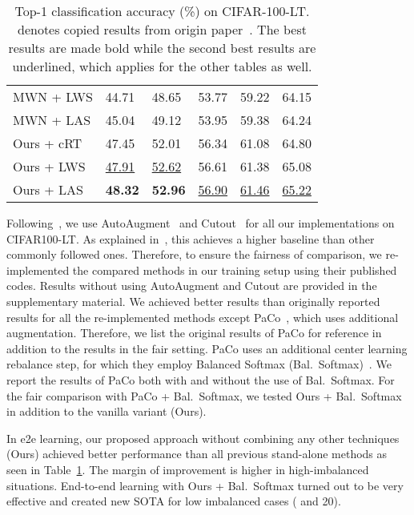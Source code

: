 \documentclass[10pt,twocolumn,letterpaper]{article}
\begin{document}
\begin{table}[t]
\begin{center}
{{\begin{tabular}{llllll}
     MWN + LWS &44.71& 48.65 & 53.77&59.22 & 64.15 \\
     MWN + LAS & 45.04& 49.12 &53.95 &59.38 & 64.24\\
Ours + cRT & 47.45 & 52.01 & 56.34 & 61.08& 64.80\\ 
     Ours + LWS & \underline{47.91} & \underline{52.62} & 56.61 & 61.38 & 65.08\\ 
     Ours + LAS & \textbf{48.32} &\textbf{52.96} & \underline{56.90} & \underline{61.46} & \underline{65.22}\\
\bottomrule
\end{tabular}
}}
\end{center}
\caption{Top-1 classification accuracy (\%) on CIFAR-100-LT. 
 denotes copied results from origin paper~\cite{PaCo,dro-lt}. The best results are made bold while the second best results are underlined, which applies for the other tables as well.}
  \label{tab:CIFAR-LT results}
\end{table}
Following~\cite{PaCo,eqlloss}, we use AutoAugment~\cite{AutoAugment} and Cutout~\cite{Cutout} for all our implementations on CIFAR100-LT. As explained in~\cite{eqlloss}, this achieves a higher baseline than other commonly followed ones. Therefore, to ensure the fairness of comparison, we re-implemented the compared methods in our training setup using their published codes. 
Results without using AutoAugment and Cutout are provided in the supplementary material.
We achieved better results than originally reported results for all the re-implemented methods except PaCo~\cite{PaCo}, which uses additional augmentation. 
Therefore, we list the original results of PaCo for reference in addition to the results in the fair setting.
PaCo uses an additional center learning rebalance step, for which they employ Balanced Softmax (Bal.~Softmax)~\cite{BALMS}. 
We report the results of PaCo both with and without the use of Bal.~Softmax.
For the fair comparison with PaCo + Bal.~Softmax, we tested Ours + Bal.~Softmax in addition to the vanilla variant (Ours). 





In e2e learning, our proposed approach without combining any other techniques (Ours) achieved better performance than all previous stand-alone methods as seen in Table~\ref{tab:CIFAR-LT results}. 
The margin of improvement is higher in high-imbalanced situations.
End-to-end learning with Ours + Bal.~Softmax turned out to be very effective and
created new SOTA for low imbalanced cases ( and 20). 
\end{document}
